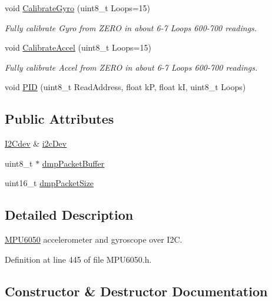 \begin{DoxyCompactItemize}
\item 
void \mbox{\hyperlink{classMPU6050_a562f930682e7c24628783561acbf51c1}{Calibrate\+Gyro}} (uint8\+\_\+t Loops=15)
\begin{DoxyCompactList}\small\item\em Fully calibrate Gyro from Z\+E\+RO in about 6-\/7 Loops 600-\/700 readings. \end{DoxyCompactList}\item 
void \mbox{\hyperlink{classMPU6050_a921f5d34643655bf3a584dd52615a526}{Calibrate\+Accel}} (uint8\+\_\+t Loops=15)
\begin{DoxyCompactList}\small\item\em Fully calibrate Accel from Z\+E\+RO in about 6-\/7 Loops 600-\/700 readings. \end{DoxyCompactList}\item 
void \mbox{\hyperlink{classMPU6050_aa0805d780a0f9ee25101db72f8e3e1b5}{P\+ID}} (uint8\+\_\+t Read\+Address, float kP, float kI, uint8\+\_\+t Loops)
\end{DoxyCompactItemize}
\subsection*{Public Attributes}
\begin{DoxyCompactItemize}
\item 
\mbox{\hyperlink{classI2Cdev}{I2\+Cdev}} \& \mbox{\hyperlink{classMPU6050_aae191481b6ec5841600b572b37861fe3}{i2c\+Dev}}
\item 
uint8\+\_\+t $\ast$ \mbox{\hyperlink{classMPU6050_aabbe31187ccf2d74a0539b9dc2927e19}{dmp\+Packet\+Buffer}}
\item 
uint16\+\_\+t \mbox{\hyperlink{classMPU6050_a99f1e24e65565db5771435c8f2a2a09c}{dmp\+Packet\+Size}}
\end{DoxyCompactItemize}


\subsection{Detailed Description}
\mbox{\hyperlink{classMPU6050}{M\+P\+U6050}} accelerometer and gyroscope over I2C. 

Definition at line 445 of file M\+P\+U6050.\+h.



\subsection{Constructor \& Destructor Documentation}
\mbox{\label{classMPU6050_a8ba282c0e5a9c0bc773d702ea5a83af1}} 
